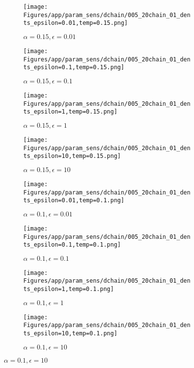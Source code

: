 \documentclass{article}
\theoremstyle{plain}
\begin{document}
\begin{appendices}
\begin{figure}
                \begin{subfigure}[b]{0.24\textwidth}
                    \centering
                    \texttt{[image: Figures/app/param\_sens/dchain/005\_20chain\_01\_dents\_epsilon=0.01,temp=0.15.png]}
                    \caption*{$\alpha=0.15,\epsilon=0.01$}
                \end{subfigure}
                \begin{subfigure}[b]{0.24\textwidth}
                    \centering
                    \texttt{[image: Figures/app/param\_sens/dchain/005\_20chain\_01\_dents\_epsilon=0.1,temp=0.15.png]}
                    \caption*{$\alpha=0.15,\epsilon=0.1$}
                \end{subfigure}
                \begin{subfigure}[b]{0.24\textwidth}
                    \centering
                    \texttt{[image: Figures/app/param\_sens/dchain/005\_20chain\_01\_dents\_epsilon=1,temp=0.15.png]}
                    \caption*{$\alpha=0.15,\epsilon=1$}
                \end{subfigure}
                \begin{subfigure}[b]{0.24\textwidth}
                    \centering
                    \texttt{[image: Figures/app/param\_sens/dchain/005\_20chain\_01\_dents\_epsilon=10,temp=0.15.png]}
                    \caption*{$\alpha=0.15,\epsilon=10$}
                \end{subfigure}
                
                \begin{subfigure}[b]{0.24\textwidth}
                    \centering
                    \texttt{[image: Figures/app/param\_sens/dchain/005\_20chain\_01\_dents\_epsilon=0.01,temp=0.1.png]}
                    \caption*{$\alpha=0.1,\epsilon=0.01$}
                \end{subfigure}
                \begin{subfigure}[b]{0.24\textwidth}
                    \centering
                    \texttt{[image: Figures/app/param\_sens/dchain/005\_20chain\_01\_dents\_epsilon=0.1,temp=0.1.png]}
                    \caption*{$\alpha=0.1,\epsilon=0.1$}
                \end{subfigure}
                \begin{subfigure}[b]{0.24\textwidth}
                    \centering
                    \texttt{[image: Figures/app/param\_sens/dchain/005\_20chain\_01\_dents\_epsilon=1,temp=0.1.png]}
                    \caption*{$\alpha=0.1,\epsilon=1$}
                \end{subfigure}
                \begin{subfigure}[b]{0.24\textwidth}
                    \centering
                    \texttt{[image: Figures/app/param\_sens/dchain/005\_20chain\_01\_dents\_epsilon=10,temp=0.1.png]}
                    \caption*{$\alpha=0.1,\epsilon=10$}
                \end{subfigure}
                

\end{figure}
\end{appendices}
\end{document}
